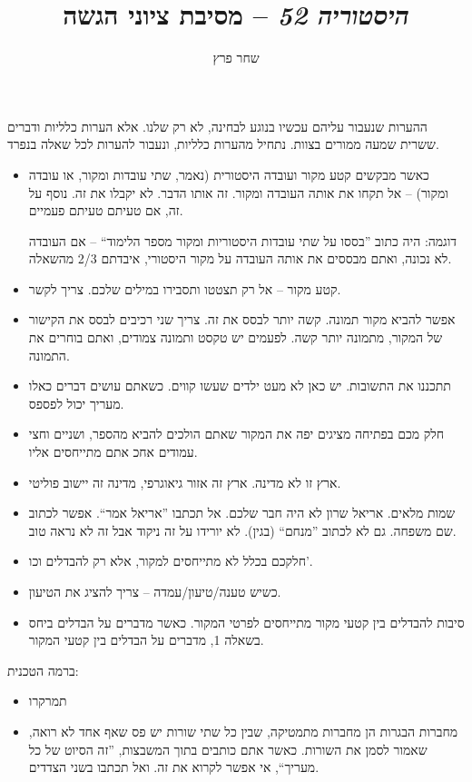 \documentclass[]{../../../../tex/classes/styledArticle}
\author{שחר פרץ}
\title{\textit{היסטוריה 52} – מסיבת ציוני הגשה}
\begin{document}
	\maketitle
	ההערות שנעבור עליהם עכשיו בנוגע לבחינה, לא רק שלנו. אלא הערות כלליות ודברים ששרית שמעה ממורים בצוות. נתחיל מהערות כלליות, ונעבור להערות לכל שאלה בנפרד. 
	\begin{itemize}
		\item כאשר מבקשים קטע מקור ועובדה היסטורית (נאמר, שתי עובדות ומקור, או עובדה ומקור) – אל תקחו את אותה העובדה ומקור. זה אותו הדבר. לא יקבלו את זה. נוסף על זה, אם טעיתם טעיתם פעמיים. 
		
		דוגמה: היה כתוב ''בססו על שתי עובדות היסטוריות ומקור מספר הלימוד`` – אם העובדה לא נכונה, ואתם מבססים את אותה העובדה על מקור היסטורי, איבדתם 2/3 מהשאלה. 
		\item קטע מקור – אל רק תצטטו ותסבירו במילים שלכם. צריך לקשר. 
		\item אפשר להביא מקור תמונה. קשה יותר לבסס את זה. צריך שני רכיבים לבסס את הקישור של המקור, מתמונה יותר קשה. לפעמים יש טקסט ותמונה צמודים, ואתם בוחרים את התמונה. 
		\item תתכננו את התשובות. יש כאן לא מעט ילדים שעשו קווים. כשאתם עושים דברים כאלו מעריך יכול לפספס. 
		\item חלק מכם בפתיחה מציגים יפה את המקור שאתם הולכים להביא מהספר, ושניים וחצי עמודים אחכ אתם מתייחסים אליו. 
		\item ארץ זו לא מדינה. ארץ זה אזור גיאוגרפי, מדינה זה יישוב פוליטי. 
		\item שמות מלאים. אריאל שרון לא היה חבר שלכם. אל תכתבו ''אריאל אמר``. אפשר לכתוב שם משפחה. גם לא לכתוב ''מנחם`` (בגין). לא יורידו על זה ניקוד אבל זה לא נראה טוב. 
		\item חלקכם בכלל לא מתייחסים למקור, אלא רק להבדלים וכו'. 
		\item כשיש טענה/טיעון/עמדה – צריך להציג את הטיעון. 
		\item סיבות להבדלים בין קטעי מקור מתייחסים לפרטי המקור. כאשר מדברים על הבדלים ביחס בשאלה 1, מדברים על הבדלים בין קטעי המקור. 
	\end{itemize}
	ברמה הטכנית: 
	\begin{itemize}
		\item תמרקרו
		\item מחברות הבגרות הן מחברות מתמטיקה, שבין כל שתי שורות יש פס שאף אחד לא רואה, שאמור לסמן את השורות. כאשר אתם כותבים בתוך המשבצות, ''זה הסיוט של כל מעריך``, אי אפשר לקרוא את זה. ואל תכתבו בשני הצדדים. 
	\end{itemize}
	
\end{document}
